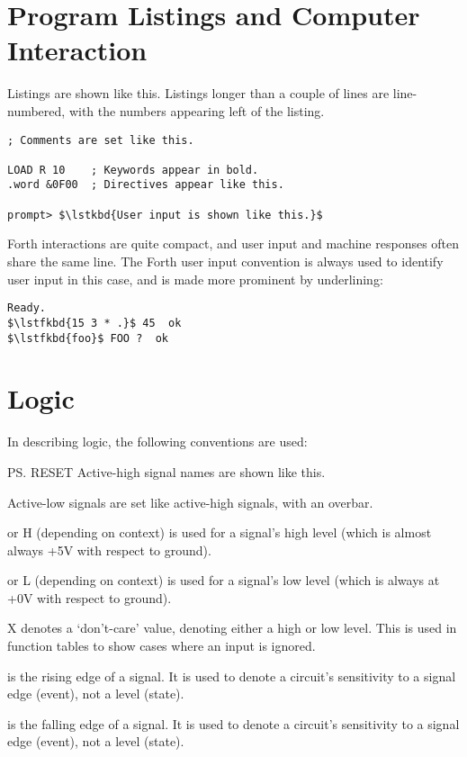 \section{Program Listings and Computer Interaction}

Listings are shown like this. Listings longer than a couple of lines are
line-numbered, with the numbers appearing left of the listing.

\begin{lstlisting}[language=cftasm]
; Comments are set like this.

LOAD R 10    ; Keywords appear in bold.
.word &0F00  ; Directives appear like this.

prompt> $\lstkbd{User input is shown like this.}$
\end{lstlisting}

\noindent Forth interactions are quite compact, and user input and machine
responses often share the same line. The Forth user input convention is always
used to identify user input in this case, and is made more prominent by
underlining:

\begin{lstlisting}[language=forth]
Ready.
$\lstfkbd{15 3 * .}$ 45  ok
$\lstfkbd{foo}$ FOO ?  ok
\end{lstlisting}

\section{Logic}

In describing logic, the following conventions are used:

\begin{description}

\item \ps{RESET} Active-high signal names are shown like this.

\item {} Active-low signals are set like active-high signals, with an overbar.

\item {} or \textsf{H} (depending on context) is used for a
  signal's high level (which is almost always +5V with respect to
  ground).

\item {} or \textsf{L} (depending on context) is used for a
  signal's low level (which is always at +0V with respect to ground).

\item \textsf{X} denotes a ‘don't-care’ value, denoting either a high
  or low level. This is used in function tables to show cases where an
  input is ignored.

\item \tU{} is the rising edge of a signal. It is used to denote a
  circuit's sensitivity to a signal edge (event), not a level (state).

\item \tD{} is the falling edge of a signal. It is used to denote a
  circuit's sensitivity to a signal edge (event), not a level (state).

\end{description}

